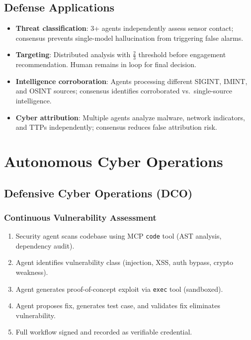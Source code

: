 \documentclass[11pt,letterpaper]{article}
\begin{document}
\subsection{Defense Applications}

\begin{itemize}
\item \textbf{Threat classification}: 3+ agents independently assess sensor contact; consensus prevents single-model hallucination from triggering false alarms.
\item \textbf{Targeting}: Distributed analysis with $\frac{2}{3}$ threshold before engagement recommendation. Human remains in loop for final decision.
\item \textbf{Intelligence corroboration}: Agents processing different SIGINT, IMINT, and OSINT sources; consensus identifies corroborated vs.\ single-source intelligence.
\item \textbf{Cyber attribution}: Multiple agents analyze malware, network indicators, and TTPs independently; consensus reduces false attribution risk.
\end{itemize}

\section{Autonomous Cyber Operations}

\subsection{Defensive Cyber Operations (DCO)}

\subsubsection{Continuous Vulnerability Assessment}

\begin{enumerate}
\item Security agent scans codebase using MCP \texttt{code} tool (AST analysis, dependency audit).
\item Agent identifies vulnerability class (injection, XSS, auth bypass, crypto weakness).
\item Agent generates proof-of-concept exploit via \texttt{exec} tool (sandboxed).
\item Agent proposes fix, generates test case, and validates fix eliminates vulnerability.
\item Full workflow signed and recorded as verifiable credential.
\end{enumerate}
\end{document}
